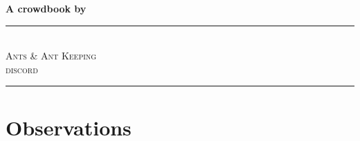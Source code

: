 \begin{titlepage}

\newcommand{\HRule}{\rule{\linewidth}{0.5mm}} %

\center %


{ \huge \bfseries A crowdbook by \vspace{1cm}}\\[4.5cm] %


\HRule \\[1.5cm]\textsc{\LARGE Ants \& Ant Keeping}\\[0.4cm]\textsc{discord}\\[1.5cm] %
\HRule









\vfill %
\end{titlepage}
\newpage

\tableofcontents{}

\newpage
\listoffigures
\newpage

\section{Observations}

